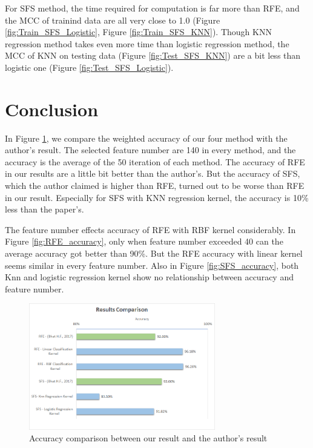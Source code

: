 \documentclass[a4paper,twocolumn]{article} %
\begin{document}
	For SFS method, the time required for computation is far more than RFE, and the MCC of trainind data are all very close to 1.0 (Figure \ref{fig:Train_SFS_Logistic}, Figure \ref{fig:Train_SFS_KNN}). Though KNN regression method takes even more time than logistic regression method, the MCC of KNN on testing data (Figure \ref{fig:Test_SFS_KNN}) are a bit less than logistic one (Figure \ref{fig:Test_SFS_Logistic}).

	\section*{Conclusion}
	\label{sec:conc}
	
	In Figure \ref{fig:Comparison}, we compare the weighted accuracy of our four method with the author's result. The selected feature number are 140 in every method, and the accuracy is the average of the 50 iteration of each method. The accuracy of RFE in our results are a little bit better than the author's. But the accuracy of SFS, which the author claimed is higher than RFE, turned out to be worse than RFE in our result. Especially for SFS with KNN regression kernel, the accuracy is 10\% less than the paper's.\newline
	
	
	The feature number effects accuracy of RFE with RBF kernel considerably. In Figure \ref{fig:RFE_accuracy}, only when feature number exceeded 40 can the average accuracy got better than 90\%. But the RFE accuracy with linear kernel seems similar in every feature number. Also in Figure \ref{fig:SFS_accuracy}, both Knn and logistic regression kernel show no relationship between accuracy and feature number.
	
	
	
	\begin{figure}[htp]
		\begin{center}
			\includegraphics[width=230pt]{comparison.png}
			\caption{Accuracy comparison between our result and the author's result}
			\label{fig:Comparison}
		\end{center}
	\end{figure}
	
\end{document}
